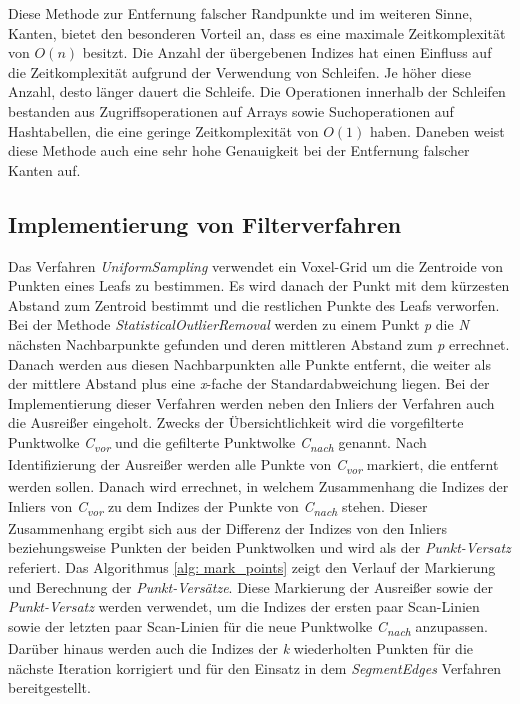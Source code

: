 Diese Methode zur Entfernung falscher Randpunkte und im weiteren Sinne, Kanten, bietet den besonderen Vorteil an, dass es eine maximale Zeitkomplexität von $O(n)$ besitzt. Die Anzahl der übergebenen Indizes hat einen Einfluss auf die Zeitkomplexität aufgrund der Verwendung von Schleifen. Je höher diese Anzahl, desto länger dauert die Schleife. Die Operationen innerhalb der Schleifen bestanden aus Zugriffsoperationen auf Arrays sowie Suchoperationen auf Hashtabellen, die eine geringe Zeitkomplexität von $O(1)$ haben. Daneben weist diese Methode auch eine sehr hohe Genauigkeit bei der Entfernung falscher Kanten auf.


\subsection{Implementierung von Filterverfahren}
Das Verfahren \textit{UniformSampling} verwendet ein Voxel-Grid um die Zentroide von Punkten eines Leafs zu bestimmen. Es wird danach der Punkt mit dem kürzesten Abstand zum Zentroid bestimmt und die restlichen Punkte des Leafs verworfen. Bei der Methode \textit{StatisticalOutlierRemoval} werden zu einem Punkt \textit{p} die \textit{N} nächsten Nachbarpunkte gefunden und deren mittleren Abstand zum \textit{p} errechnet. Danach werden aus diesen Nachbarpunkten alle Punkte entfernt, die weiter als der mittlere Abstand plus eine \textit{x}-fache der Standardabweichung liegen. Bei der Implementierung dieser Verfahren werden neben den Inliers der Verfahren auch die Ausreißer eingeholt. Zwecks der Übersichtlichkeit wird die vorgefilterte Punktwolke \textit{C\textsubscript{vor}} und die gefilterte Punktwolke \textit{C\textsubscript{nach}} genannt. Nach Identifizierung der Ausreißer werden alle Punkte von \textit{C\textsubscript{vor}} markiert, die entfernt werden sollen. Danach wird errechnet, in welchem Zusammenhang die Indizes der Inliers von \textit{C\textsubscript{vor}} zu dem Indizes der Punkte von \textit{C\textsubscript{nach}} stehen. Dieser Zusammenhang ergibt sich aus der Differenz der Indizes von den Inliers beziehungsweise Punkten der beiden Punktwolken und wird als der \textit{Punkt-Versatz} referiert. Das Algorithmus \ref{alg: mark_points} zeigt den Verlauf der Markierung und Berechnung der \textit{Punkt-Versätze}. Diese Markierung der Ausreißer sowie der \textit{Punkt-Versatz} werden verwendet, um die Indizes der ersten paar Scan-Linien sowie der letzten paar Scan-Linien für die neue Punktwolke \textit{C\textsubscript{nach}} anzupassen. Darüber hinaus werden auch die Indizes der \textit{k} wiederholten Punkten für die nächste Iteration korrigiert und für den Einsatz in dem \textit{SegmentEdges} Verfahren bereitgestellt. 

